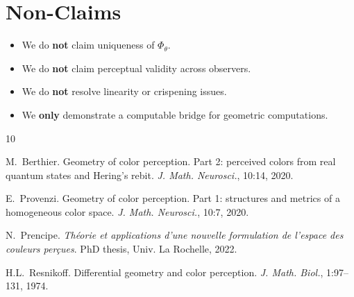 \documentclass[11pt]{article}
\theoremstyle{plain}
\theoremstyle{definition}
\theoremstyle{remark}
\begin{document}
\section*{Non-Claims}

\begin{itemize}
    \item We do \textbf{not} claim uniqueness of $\Phi_\theta$.
    \item We do \textbf{not} claim perceptual validity across observers.
    \item We do \textbf{not} resolve linearity or crispening issues.
    \item We \textbf{only} demonstrate a computable bridge for geometric computations.
\end{itemize}


\begin{thebibliography}{10}

M.~Berthier. Geometry of color perception. Part 2: perceived colors from real quantum states and Hering's rebit. \emph{J. Math. Neurosci.}, 10:14, 2020.

E.~Provenzi. Geometry of color perception. Part 1: structures and metrics of a homogeneous color space. \emph{J. Math. Neurosci.}, 10:7, 2020.

N.~Prencipe. \emph{Th\'eorie et applications d'une nouvelle formulation de l'espace des couleurs per\c{c}ues}. PhD thesis, Univ. La Rochelle, 2022.

H.L.~Resnikoff. Differential geometry and color perception. \emph{J. Math. Biol.}, 1:97--131, 1974.

\end{thebibliography}
\end{document}
